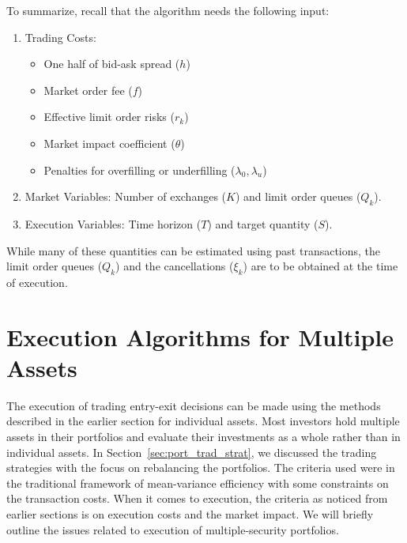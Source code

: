 To summarize, recall that the algorithm needs the following input:
	\begin{enumerate}[--]
	\item Trading Costs: 
		\begin{itemize}
		\item One half of bid-ask spread ($h$)
		\item Market order fee ($f$)
		\item Effective limit order risks ($r_k$)
		\item Market impact coefficient ($\theta$)
		\item Penalties for overfilling or underfilling ($\lambda_0,\lambda_u$)
		\end{itemize}
	\item Market Variables: Number of exchanges ($K$) and limit order queues ($Q_k$).
	\item Execution Variables: Time horizon ($T$) and target quantity ($S$).
	\end{enumerate}
While many of these quantities can be estimated using past transactions, the limit order queues ($Q_k$) and the cancellations ($\xi_k$) are to be obtained at the time of execution.

\section{Execution Algorithms for Multiple Assets}

The execution of trading entry-exit decisions can be made using the methods described in the earlier section for individual assets. Most investors hold multiple assets in their portfolios and evaluate their investments as a whole rather than in individual assets. In Section~\ref{sec:port_trad_strat}, we discussed the trading strategies with the focus on rebalancing the portfolios. The criteria used were in the traditional framework of mean-variance efficiency with some constraints on the transaction costs. When it comes to execution, the criteria as noticed from earlier sections is on execution costs and the market impact. We will briefly outline the issues related to execution of multiple-security portfolios.




